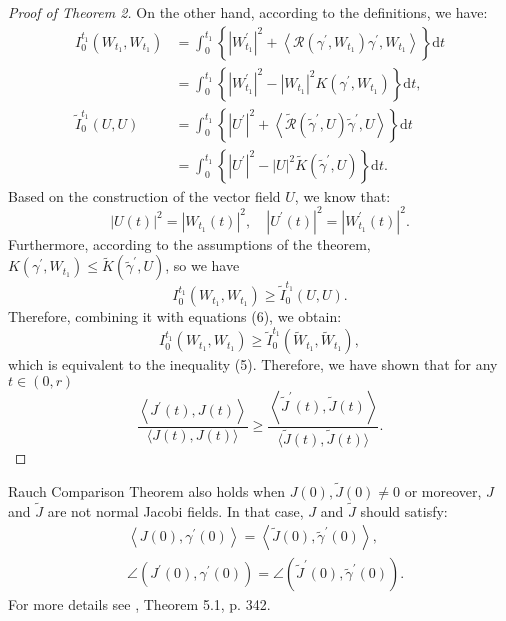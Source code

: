 \documentclass{ctexart}
\begin{document}
\begin{proof}[Proof of Theorem 2]
  On the other hand, according to the definitions, we have:
  $$
  \begin{aligned}
  I_0^{t_1}\left(W_{t_1}, W_{t_1}\right) & =\int_0^{t_1}\left\{\left|W_{t_1}^{\prime}\right|^2+\left\langle\mathcal{R}\left(\gamma^{\prime}, W_{t_1}\right) \gamma^{\prime}, W_{t_1}\right\rangle\right\} \mathrm{d} t \\
  & =\int_0^{t_1}\left\{\left|W_{t_1}^{\prime}\right|^2-\left|W_{t_1}\right|^2 K\left(\gamma^{\prime}, W_{t_1}\right)\right\} \mathrm{d} t, \\
  \tilde{I}_0^{t_1}(U, U) & =\int_0^{t_1}\left\{\left|U^{\prime}\right|^2+\left\langle\tilde{\mathcal{R}}\left(\tilde{\gamma}^{\prime}, U\right) \tilde{\gamma}^{\prime}, U\right\rangle\right\} \mathrm{d} t \\
  & =\int_0^{t_1}\left\{\left|U^{\prime}\right|^2-|U|^2 \tilde{K}\left(\tilde{\gamma}^{\prime}, U\right)\right\} \mathrm{d} t .
  \end{aligned}
  $$
  Based on the construction of the vector field $U$, we know that:
  $$
  |U(t)|^2=\left|W_{t_1}(t)\right|^2, \quad\left|U^{\prime}(t)\right|^2=\left|W_{t_1}^{\prime}(t)\right|^2 .
  $$
  Furthermore, according to the assumptions of the theorem, $K\left(\gamma^{\prime}, W_{t_1}\right) \leq \tilde{K}\left(\tilde{\gamma}^{\prime}, U\right)$, so we have 
  $$
  I_0^{t_1}\left(W_{t_1}, W_{t_1}\right) \geq \tilde{I}_0^{t_1}(U, U) .
  $$
  Therefore, combining it with equations (6), we obtain:
  $$
  I_0^{t_1}\left(W_{t_1}, W_{t_1}\right) \geq \tilde{I}_0^{t_1}\left(\tilde{W}_{t_1}, \tilde{W}_{t_1}\right),
  $$
  which is equivalent to the inequality (5). Therefore, we have shown that for any $t \in (0, r)$
  $$
  \frac{\left\langle J^{\prime}(t), J(t)\right\rangle}{\langle J(t), J(t)\rangle} \geq \frac{\left\langle\tilde{J}^{\prime}(t), \tilde{J}(t)\right\rangle}{\langle\tilde{J}(t), \tilde{J}(t)\rangle}.
  $$
\end{proof}
\begin{remark}
  Rauch Comparison Theorem also holds when $J(0),\tilde{J}(0)\neq 0$ or moreover, $J$ and $\tilde{J}$ are not normal Jacobi fields. 
  In that case, $J$ and $\tilde{J}$ should satisfy: 
  $$
  \begin{aligned}
    & \left\langle J(0), \gamma^{\prime}(0)\right\rangle=\left\langle\tilde{J}(0), \tilde{\gamma}^{\prime}(0)\right\rangle, \\
    & \angle \left(J^{\prime}(0), \gamma^{\prime}(0)\right)=\angle\left(\tilde{J}^{\prime}(0), \tilde{\gamma}^{\prime}(0)\right).
  \end{aligned}  
  $$
  For more details see \cite{ChenWeiHuan2002}, Theorem 5.1, p. 342. 
\end{remark}



\end{document}
